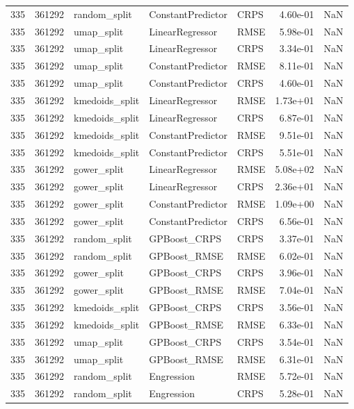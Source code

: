\begin{tabular}{rrlllrr}
335 & 361292 & random\_split & ConstantPredictor & CRPS & 4.60e-01 & NaN \\
335 & 361292 & umap\_split & LinearRegressor & RMSE & 5.98e-01 & NaN \\
335 & 361292 & umap\_split & LinearRegressor & CRPS & 3.34e-01 & NaN \\
335 & 361292 & umap\_split & ConstantPredictor & RMSE & 8.11e-01 & NaN \\
335 & 361292 & umap\_split & ConstantPredictor & CRPS & 4.60e-01 & NaN \\
335 & 361292 & kmedoids\_split & LinearRegressor & RMSE & 1.73e+01 & NaN \\
335 & 361292 & kmedoids\_split & LinearRegressor & CRPS & 6.87e-01 & NaN \\
335 & 361292 & kmedoids\_split & ConstantPredictor & RMSE & 9.51e-01 & NaN \\
335 & 361292 & kmedoids\_split & ConstantPredictor & CRPS & 5.51e-01 & NaN \\
335 & 361292 & gower\_split & LinearRegressor & RMSE & 5.08e+02 & NaN \\
335 & 361292 & gower\_split & LinearRegressor & CRPS & 2.36e+01 & NaN \\
335 & 361292 & gower\_split & ConstantPredictor & RMSE & 1.09e+00 & NaN \\
335 & 361292 & gower\_split & ConstantPredictor & CRPS & 6.56e-01 & NaN \\
335 & 361292 & random\_split & GPBoost\_CRPS & CRPS & 3.37e-01 & NaN \\
335 & 361292 & random\_split & GPBoost\_RMSE & RMSE & 6.02e-01 & NaN \\
335 & 361292 & gower\_split & GPBoost\_CRPS & CRPS & 3.96e-01 & NaN \\
335 & 361292 & gower\_split & GPBoost\_RMSE & RMSE & 7.04e-01 & NaN \\
335 & 361292 & kmedoids\_split & GPBoost\_CRPS & CRPS & 3.56e-01 & NaN \\
335 & 361292 & kmedoids\_split & GPBoost\_RMSE & RMSE & 6.33e-01 & NaN \\
335 & 361292 & umap\_split & GPBoost\_CRPS & CRPS & 3.54e-01 & NaN \\
335 & 361292 & umap\_split & GPBoost\_RMSE & RMSE & 6.31e-01 & NaN \\
335 & 361292 & random\_split & Engression & RMSE & 5.72e-01 & NaN \\
335 & 361292 & random\_split & Engression & CRPS & 5.28e-01 & NaN \\

\end{tabular}
